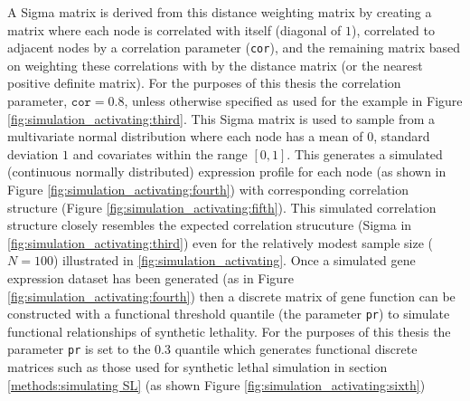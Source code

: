 A Sigma matrix is derived from this distance weighting matrix by creating a matrix where each node is correlated with itself (diagonal of $1$), correlated to adjacent nodes by a correlation parameter (\texttt{cor}), and the remaining matrix based on weighting these correlations with by the distance matrix (or the nearest positive definite matrix). For the purposes of this thesis the correlation parameter, $\texttt{cor} = 0.8$, unless otherwise specified as used for the example in Figure \ref{fig:simulation_activating:third}. This Sigma matrix is used to sample from a multivariate normal distribution where each node has a mean of $0$, standard deviation $1$ and covariates within the range $[0,1]$. This generates a simulated (continuous normally distributed) expression profile for each node (as shown in Figure \ref{fig:simulation_activating:fourth}) with corresponding correlation structure (Figure \ref{fig:simulation_activating:fifth}). This simulated correlation structure closely resembles the expected correlation strucuture (Sigma in \ref{fig:simulation_activating:third}) even for the relatively modest sample size ($N=100$) illustrated in \ref{fig:simulation_activating}. Once a simulated gene expression dataset has been generated (as in Figure \ref{fig:simulation_activating:fourth}) then a discrete matrix of gene function can be constructed with a functional threshold quantile (the parameter \texttt{pr}) to simulate functional relationships of synthetic lethality. For the purposes of this thesis the parameter \texttt{pr} is set to the 0.3 quantile which generates functional discrete matrices such as those used for synthetic lethal simulation in section \ref{methods:simulating SL} (as shown Figure \ref{fig:simulation_activating:sixth})


